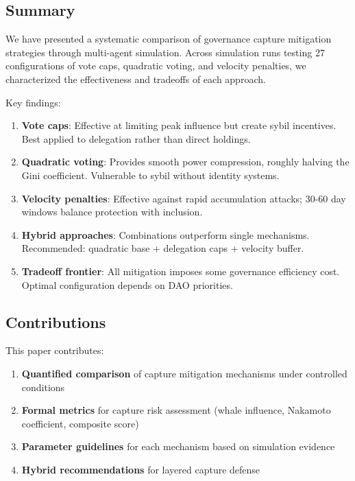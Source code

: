 
\subsection{Summary}

We have presented a systematic comparison of governance capture mitigation strategies through multi-agent simulation. Across \experimentruns{} simulation runs testing 27 configurations of vote caps, quadratic voting, and velocity penalties, we characterized the effectiveness and tradeoffs of each approach.

Key findings:

\begin{enumerate}
    \item \textbf{Vote caps}: Effective at limiting peak influence but create sybil incentives. Best applied to delegation rather than direct holdings.

    \item \textbf{Quadratic voting}: Provides smooth power compression, roughly halving the Gini coefficient. Vulnerable to sybil without identity systems.

    \item \textbf{Velocity penalties}: Effective against rapid accumulation attacks; 30-60 day windows balance protection with inclusion.

    \item \textbf{Hybrid approaches}: Combinations outperform single mechanisms. Recommended: quadratic base + delegation caps + velocity buffer.

    \item \textbf{Tradeoff frontier}: All mitigation imposes some governance efficiency cost. Optimal configuration depends on DAO priorities.
\end{enumerate}

\subsection{Contributions}

This paper contributes:

\begin{enumerate}
    \item \textbf{Quantified comparison} of capture mitigation mechanisms under controlled conditions
    \item \textbf{Formal metrics} for capture risk assessment (whale influence, Nakamoto coefficient, composite score)
    \item \textbf{Parameter guidelines} for each mechanism based on simulation evidence
    \item \textbf{Hybrid recommendations} for layered capture defense
\end{enumerate}

